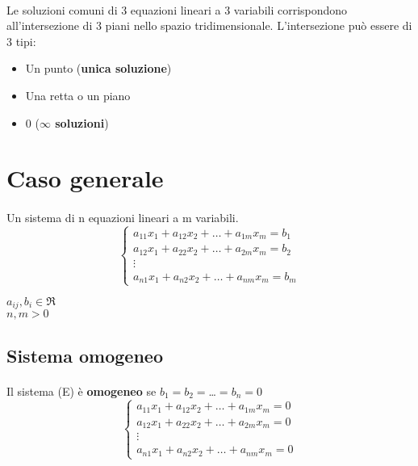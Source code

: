 \documentclass[a4paper, 12pt]{report}
\begin{document}
            \paragraph{}Le soluzioni comuni di 3 equazioni lineari a 3 variabili corrispondono all'intersezione di 3 piani nello spazio tridimensionale.
            L'intersezione può essere di 3 tipi:
            \begin{itemize}
                \item Un punto (\textbf{unica soluzione})
                \item Una retta o un piano
                \item 0 (\textbf{$\infty$ soluzioni})
            \end{itemize}
        \section{Caso generale}
            \paragraph{}Un sistema di n equazioni lineari a m variabili.
            $$\begin{cases}
                a_{11}x_1+a_{12}x_2+\dots+a_{1m}x_m=b_1\\
                a_{12}x_1+a_{22}x_2+\dots+a_{2m}x_m=b_2\\
                \vdots\\
                a_{n1}x_1+a_{n2}x_2+\dots+a_{nm}x_m=b_m
            \end{cases}$$
            \begin{center}
                $a_{ij},b_i\in\Re$\\
                $n,m > 0$\\
            \end{center}
                \subsection{Sistema omogeneo}   
                    \paragraph{}Il sistema (E) è \textbf{omogeneo} se $b_1=b_2=$\dots$=b_n=0$ 
                    $$\begin{cases}
                        a_{11}x_1+a_{12}x_2+\dots+a_{1m}x_m=0\\
                        a_{12}x_1+a_{22}x_2+\dots+a_{2m}x_m=0\\
                        \vdots\\
                        a_{n1}x_1+a_{n2}x_2+\dots+a_{nm}x_m=0
                    \end{cases}$$
\end{document}
